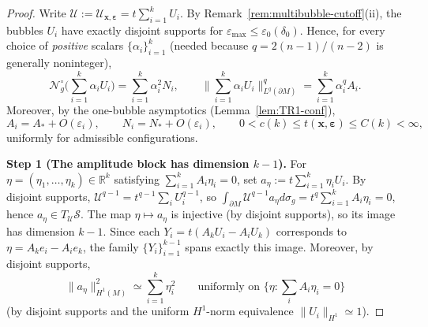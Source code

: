 \documentclass[11pt,reqno,a4paper]{amsart}
\numberwithin{equation}{section}
\theoremstyle{plain}
\theoremstyle{remark}
\theoremstyle{plain}
\begin{document}
\begin{proof}
Write $\mathcal U:=\mathcal U_{\mathbf x,\boldsymbol\varepsilon}=t\sum_{i=1}^k U_i$.
By Remark~\ref{rem:multibubble-cutoff}\textup{(ii)}, the bubbles $U_i$ have exactly
disjoint supports for $\varepsilon_{\max}\le\varepsilon_0(\delta_0)$.
Hence, for every choice of \emph{positive} scalars $\{\alpha_i\}_{i=1}^k$ (needed because
$q=2(n-1)/(n-2)$ is generally noninteger),
\begin{equation}\label{eq:disjoint-splitting-bubbles}
\mathcal N_g^\circ\Big(\sum_{i=1}^k \alpha_iU_i\Big)
=\sum_{i=1}^k \alpha_i^2N_i,
\qquad
\Big\|\sum_{i=1}^k \alpha_iU_i\Big\|_{L^q(\partial M)}^q
=\sum_{i=1}^k \alpha_i^qA_i.
\end{equation}
Moreover, by the one-bubble asymptotics (Lemma~\ref{lem:TR1-conf}),
\begin{equation}\label{eq:Ai-Ni-uniform}
A_i=A_\ast+O(\varepsilon_i),
\qquad
N_i=N_\ast+O(\varepsilon_i),
\qquad
0<c(k)\le t(\mathbf x,\boldsymbol\varepsilon)\le C(k)<\infty,
\end{equation}
uniformly for admissible configurations.

\medskip\noindent
\textbf{Step 1 (The amplitude block has dimension $k-1$).}
For $\eta=(\eta_1,\dots,\eta_k)\in\mathbb R^k$ satisfying $\sum_{i=1}^k A_i\eta_i=0$,
set $a_\eta:=t\sum_{i=1}^k \eta_iU_i$.
By disjoint supports, $\mathcal U^{q-1}=t^{q-1}\sum_i U_i^{q-1}$, so
$\int_{\partial M}\mathcal U^{q-1}a_\eta d\sigma_g=t^q\sum_{i=1}^k A_i\eta_i=0$,
hence $a_\eta\in T_{\mathcal U}\mathcal S$.
The map $\eta\mapsto a_\eta$ is injective (by disjoint supports), so its image has dimension $k-1$.
Since each $Y_i=t(A_kU_i-A_iU_k)$ corresponds to
$\eta=A_ke_i-A_ie_k$, the family $\{Y_i\}_{i=1}^{k-1}$
spans exactly this image. Moreover, by disjoint supports,
\begin{equation}\label{eq:amp-norm-equiv}
\|a_\eta\|_{H^1(M)}^2\simeq\sum_{i=1}^k \eta_i^2
\qquad\text{uniformly on }\Big\{\eta:\sum_i A_i\eta_i=0\Big\}
\end{equation}
(by disjoint supports and the uniform $H^1$-norm equivalence $\|U_i\|_{H^1}\simeq1$).


\end{proof}
\end{document}
